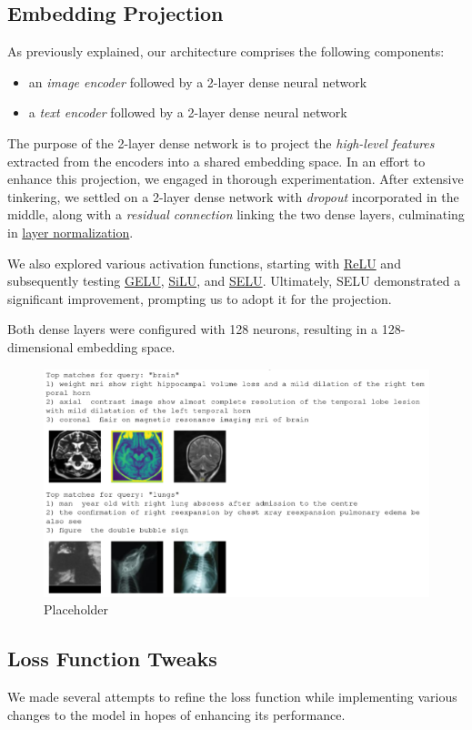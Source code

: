 \documentclass[10pt,twocolumn,letterpaper]{article}
\begin{document}
\subsection{Embedding Projection}
As previously explained, our architecture comprises the following components:
\begin{itemize}
   \item an \textit{image encoder} followed by a 2-layer dense neural network
   \item a \textit{text encoder} followed by a 2-layer dense neural network
\end{itemize}
The purpose of the 2-layer dense network is to project the \textit{high-level features} extracted from the encoders into a shared embedding space.
In an effort to enhance this projection, we engaged in thorough experimentation.
After extensive tinkering, we settled on a 2-layer dense network with \textit{dropout} incorporated in the middle, along with a \textit{residual connection} linking the two dense layers, culminating in \href{https://keras.io/api/layers/normalization_layers/layer_normalization/}{layer normalization}.

We also explored various activation functions, starting with \href{https://keras.io/api/layers/activation_layers/relu/}{ReLU} and subsequently testing \href{https://www.tensorflow.org/api_docs/python/tf/keras/activations/gelu}{GELU}, \href{https://www.tensorflow.org/api_docs/python/tf/nn/silu}{SiLU}, and \href{https://www.tensorflow.org/api_docs/python/tf/nn/selu}{SELU}. Ultimately, SELU demonstrated a significant improvement, prompting us to adopt it for the projection.

Both dense layers were configured with 128 neurons, resulting in a 128-dimensional embedding space.

\begin{figure}[H]
   \centering
   \includegraphics[width=0.6\linewidth]{img/T2I_test1.png}
   \caption{Placeholder}
\end{figure}  

\subsection{Loss Function Tweaks}
We made several attempts to refine the loss function while implementing various changes to the model in hopes of enhancing its performance.
\end{document}
